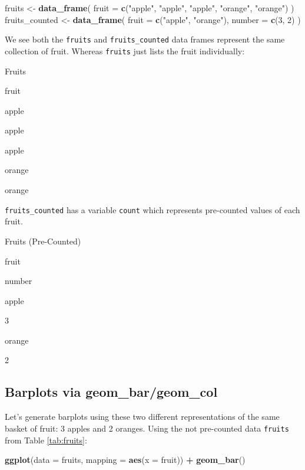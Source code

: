 \documentclass[12pt,]{krantz}
\makeatletter
\newenvironment{Shaded}{\begin{snugshade}}{\end{snugshade}}
\newcommand{\KeywordTok}[1]{\textcolor[rgb]{0.27,0.27,0.27}{\textbf{#1}}}
\newcommand{\DataTypeTok}[1]{\textcolor[rgb]{0.27,0.27,0.27}{#1}}
\newcommand{\DecValTok}[1]{\textcolor[rgb]{0.06,0.06,0.06}{#1}}
\newcommand{\StringTok}[1]{\textcolor[rgb]{0.5,0.5,0.5}{#1}}
\newcommand{\OperatorTok}[1]{\textcolor[rgb]{0.43,0.43,0.43}{\textbf{#1}}}
\newcommand{\NormalTok}[1]{#1}
\newenvironment{kframe}{%
\medskip{}
\setlength{\fboxsep}{.8em}
 \def\at@end@of@kframe{}%
 \ifinner\ifhmode%
  \def\at@end@of@kframe{\end{minipage}}%
  \begin{minipage}{\columnwidth}%
 \fi\fi%
 \def\FrameCommand##1{\hskip\@totalleftmargin \hskip-\fboxsep
 \colorbox{shadecolor}{##1}\hskip-\fboxsep
     \hskip-\linewidth \hskip-\@totalleftmargin \hskip\columnwidth}%
 \MakeFramed {\advance\hsize-\width
   \@totalleftmargin\z@ \linewidth\hsize
   \@setminipage}}%
 {\par\unskip\endMakeFramed%
 \at@end@of@kframe}
\renewenvironment{Shaded}{\begin{kframe}}{\end{kframe}}
\makeatother
\begin{document}
\begin{Shaded}
\begin{Highlighting}[]
\NormalTok{fruits <-}\StringTok{ }\KeywordTok{data_frame}\NormalTok{(}
  \DataTypeTok{fruit =} \KeywordTok{c}\NormalTok{(}\StringTok{"apple"}\NormalTok{, }\StringTok{"apple"}\NormalTok{, }\StringTok{"apple"}\NormalTok{, }\StringTok{"orange"}\NormalTok{, }\StringTok{"orange"}\NormalTok{)}
\NormalTok{)}
\NormalTok{fruits_counted <-}\StringTok{ }\KeywordTok{data_frame}\NormalTok{(}
  \DataTypeTok{fruit =} \KeywordTok{c}\NormalTok{(}\StringTok{"apple"}\NormalTok{, }\StringTok{"orange"}\NormalTok{),}
  \DataTypeTok{number =} \KeywordTok{c}\NormalTok{(}\DecValTok{3}\NormalTok{, }\DecValTok{2}\NormalTok{)}
\NormalTok{)}
\end{Highlighting}
\end{Shaded}

We see both the \texttt{fruits} and \texttt{fruits\_counted} data frames
represent the same collection of fruit. Whereas \texttt{fruits} just
lists the fruit individually:

\label{tab:fruits}Fruits

fruit

apple

apple

apple

orange

orange

\texttt{fruits\_counted} has a variable \texttt{count} which represents
pre-counted values of each fruit.

\label{tab:fruitscounted}Fruits (Pre-Counted)

fruit

number

apple

3

orange

2

\subsection{Barplots via
geom\_bar/geom\_col}\label{barplots-via-geom_bargeom_col}

Let's generate barplots using these two different representations of the
same basket of fruit: 3 apples and 2 oranges. Using the not pre-counted
data \texttt{fruits} from Table \ref{tab:fruits}:

\begin{Shaded}
\begin{Highlighting}[]
\KeywordTok{ggplot}\NormalTok{(}\DataTypeTok{data =}\NormalTok{ fruits, }\DataTypeTok{mapping =} \KeywordTok{aes}\NormalTok{(}\DataTypeTok{x =}\NormalTok{ fruit)) }\OperatorTok{+}
\StringTok{  }\KeywordTok{geom_bar}\NormalTok{()}
\end{Highlighting}
\end{Shaded}
\end{document}
